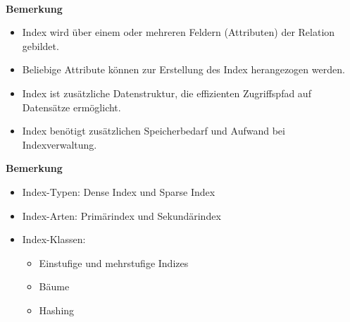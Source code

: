 \begin{frame}{\insertsection}
\framesubtitle{\insertsubsection}	
\begin{block}{\textbf{Bemerkung}}
	\begin{itemize}
		\item Index wird über einem oder mehreren Feldern (Attributen) der Relation gebildet.
		\item Beliebige Attribute können zur Erstellung des Index herangezogen werden.
		\pause
		\item Index ist zus\"atzliche Datenstruktur, die effizienten Zugriffspfad auf Datens\"atze erm\"oglicht.  	
		\item Index ben\"otigt zus\"atzlichen Speicherbedarf und Aufwand bei Indexverwaltung.				
	\end{itemize}
\end{block}
\abs
\begin{block}{\textbf{Bemerkung}}
	\begin{itemize}
		\item Index-Typen: Dense Index und Sparse Index
		\item Index-Arten: Prim\"arindex und Sekund\"arindex
		\item Index-Klassen: 
		\begin{itemize}
			\item Einstufige und mehrstufige Indizes
			\item B\"aume
			\item Hashing
		\end{itemize}
	\end{itemize}
\end{block}
\end{frame}

